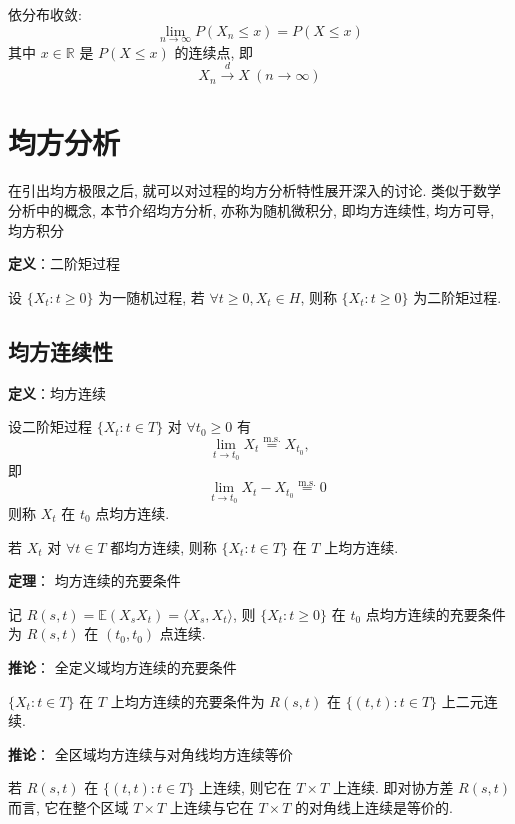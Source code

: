 \documentclass[openany]{ctexbook}
\theoremstyle{kaiti}
\theoremstyle{normal}
\begin{document}
依分布收敛:
\begin{equation}
  \lim_{n\to\infty}P(X_n\leqslant x)=P(X\leqslant x)
\end{equation}
 其中 $x\in\mathbb{R}$ 是 $P(X\leqslant x)$ 的连续点, 即
\begin{equation}
  X_n\overset{d}{\to}X~(n\to\infty)
\end{equation}


\section{均方分析}

在引出均方极限之后, 就可以对过程的均方分析特性展开深入的讨论. 类似于数学分析中的概念, 本节介绍均方分析, 亦称为随机微积分, 即均方连续性, 均方可导, 均方积分

\textbf{定义}：二阶矩过程

设 $\{X_t:t\geqslant0\}$ 为一随机过程, 若 $\forall t\geqslant0,X_t\in H$, 则称 $\{X_t:t\geqslant0\}$ 为二阶矩过程.

\subsection{均方连续性}

\textbf{定义}：均方连续

设二阶矩过程 $\{X_t:t\in T\}$ 对 $\forall t_0\geqslant0$ 有
\begin{equation}
  \lim_{t\to t_0}X_t\overset{\mathrm{m.s.}}{=}X_{t_0},
\end{equation}
 即
\begin{equation}
  \quad\lim_{t\to t_0}X_t-X_{t_0}\overset{\mathrm{m.s.}}{=}0
\end{equation}
 则称 $X_t$ 在 $t_0$ 点均方连续.

若 $X_t$ 对 $\forall t\in T$ 都均方连续, 则称 $\{X_t:t\in T\}$ 在 $T$ 上均方连续.

\textbf{定理}： 均方连续的充要条件

记 $R(s,t)=\mathbb{E}(X_sX_t)=\langle X_s,X_t\rangle$, 则 $\{X_t:t\geqslant0\}$ 在 $t_0$ 点均方连续的充要条件为 $R(s,t)$ 在 $(t_0,t_0)$ 点连续.

\textbf{推论}： 全定义域均方连续的充要条件

$\{X_t:t\in T\}$ 在 $T$ 上均方连续的充要条件为 $R(s,t)$ 在 $\{(t,t):t\in T\}$ 上二元连续.

\textbf{推论}： 全区域均方连续与对角线均方连续等价

若 $R(s,t)$ 在 $\{(t,t):t\in T\}$ 上连续, 则它在 $T\times T$ 上连续. 即对协方差 $R(s,t)$ 而言, 它在整个区域 $T\times T$ 上连续与它在 $T\times T$ 的对角线上连续是等价的.
\end{document}
